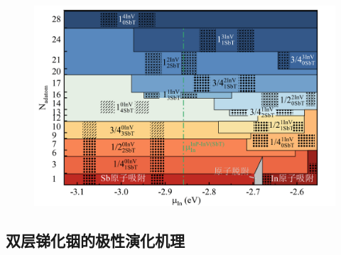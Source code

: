 \begin{figure}
{    }
\end{figure}

\begin{figure}
    \includegraphics{pic/IS_DFT_2LInSb_partPhase.png}
\end{figure}

\subsection{双层锑化铟的极性演化机理}

